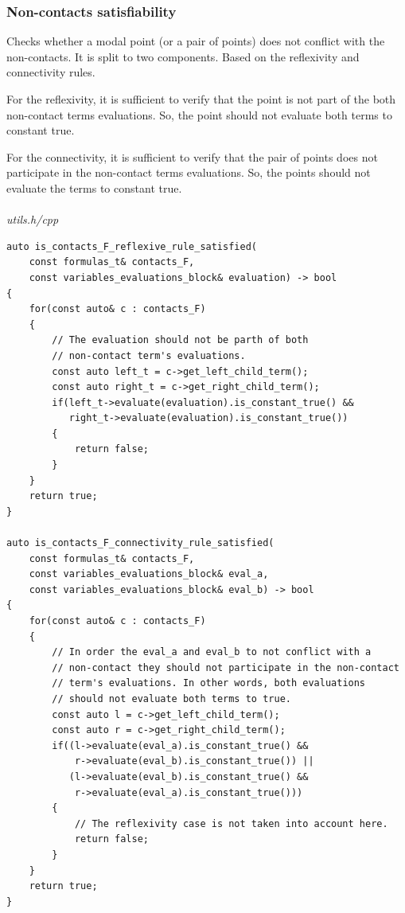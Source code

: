 \documentclass{article}
\begin{document}
	\newpage
	\subsubsection*{Non-contacts satisfiability}
	Checks whether a modal point (or a pair of points) does not conflict with the non-contacts. It is split to two components. Based on the reflexivity and connectivity rules.

	For the reflexivity, it is sufficient to verify that the point is not part of the both non-contact terms evaluations. So, the point should not evaluate both terms to constant true.

	For the connectivity, it is sufficient to verify that the pair of points does not participate in the non-contact terms evaluations. So, the points should not evaluate the terms to constant true.
	\\
	\\
\noindent
\textit{utils.h/cpp}
\begin{lstlisting}
auto is_contacts_F_reflexive_rule_satisfied(
	const formulas_t& contacts_F,
	const variables_evaluations_block& evaluation) -> bool
{
    for(const auto& c : contacts_F)
    {
        // The evaluation should not be parth of both
        // non-contact term's evaluations.
        const auto left_t = c->get_left_child_term();
        const auto right_t = c->get_right_child_term();
        if(left_t->evaluate(evaluation).is_constant_true() &&
           right_t->evaluate(evaluation).is_constant_true())
        {
            return false;
        }
    }
    return true;
}

auto is_contacts_F_connectivity_rule_satisfied(
	const formulas_t& contacts_F,
	const variables_evaluations_block& eval_a,
	const variables_evaluations_block& eval_b) -> bool
{
    for(const auto& c : contacts_F)
    {
        // In order the eval_a and eval_b to not conflict with a
        // non-contact they should not participate in the non-contact
        // term's evaluations. In other words, both evaluations
        // should not evaluate both terms to true.
        const auto l = c->get_left_child_term();
        const auto r = c->get_right_child_term();
        if((l->evaluate(eval_a).is_constant_true() &&
            r->evaluate(eval_b).is_constant_true()) ||
           (l->evaluate(eval_b).is_constant_true() &&
            r->evaluate(eval_a).is_constant_true()))
        {
            // The reflexivity case is not taken into account here.
            return false;
        }
    }
    return true;
}

\end{lstlisting}
\end{document}
